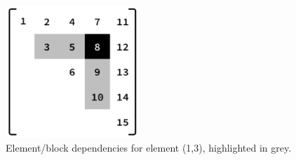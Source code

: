 \documentclass[../thesis]{subfiles}
\begin{document}
	\begin{figure}
		\centering
		\includegraphics[height=5cm]{assets/images/case/dependencies.png}
		\caption[Element/block dependencies.]{Element/block dependencies for element (1,3), highlighted in grey.}
	\end{figure}
\end{document}
